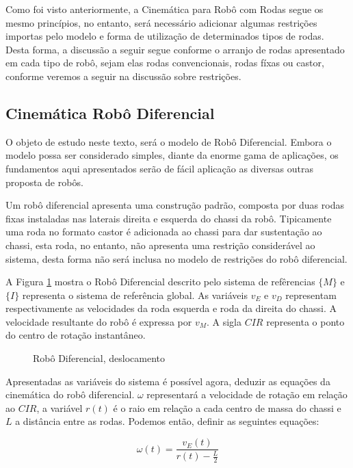 Como foi visto anteriormente, a Cinemática para Robô com Rodas segue os mesmo princípios, no entanto, será necessário adicionar algumas restrições importas pelo modelo e forma de utilização de determinados tipos de rodas.
Desta forma, a discussão a seguir segue conforme o arranjo de rodas apresentado em cada tipo de robô, sejam elas rodas convencionais, rodas fíxas ou castor, conforme veremos a seguir na discussão sobre restrições.

\subsection{Cinemática Robô Diferencial}

O objeto de estudo neste texto, será o modelo de Robô Diferencial. Embora o modelo possa ser considerado simples, diante da enorme gama de aplicações, os fundamentos aqui apresentados serão de fácil aplicação as diversas outras proposta de robôs.

Um robô diferencial apresenta uma construção padrão, composta por duas rodas fixas instaladas nas laterais direita e esquerda do chassi da robô. Tipicamente uma roda no formato castor é adicionada ao chassi para dar sustentação ao chassi, esta roda, no entanto, 
não apresenta uma restrição considerável ao sistema, desta forma não será inclusa no modelo de restrições do robô diferencial.

A Figura \ref{fig:car01} mostra o Robô Diferencial descrito pelo sistema de refêrencias $\{M\}$ e $\{I\}$ representa o sistema de referência global.
As variáveis $v_{E}$ e $v_{D}$ representam respectivamente as velocidades da roda esquerda e roda da direita do chassi. A velocidade resultante do robô é expressa por $v_{M}$.
A sigla $CIR$ representa o ponto do centro de rotação instantâneo. 
\begin{figure}[!ht]
    
    \caption{Robô Diferencial, deslocamento}
    \label{fig:car01}
    \end{figure}

Apresentadas as variáveis do sistema é possível agora, deduzir as equações da cinemática do robô diferencial. $\omega$ representará a velocidade de rotação em relação ao $CIR$, a variável $r(t)$ é o raio em relação a cada centro de massa do chassi e $L$ a distância entre as rodas. Podemos então, definir as seguintes equações:

\begin{equation}
    \omega(t) = \frac{v_{E}(t)}{r(t) - \displaystyle\frac{L}{2}}
\end{equation}

